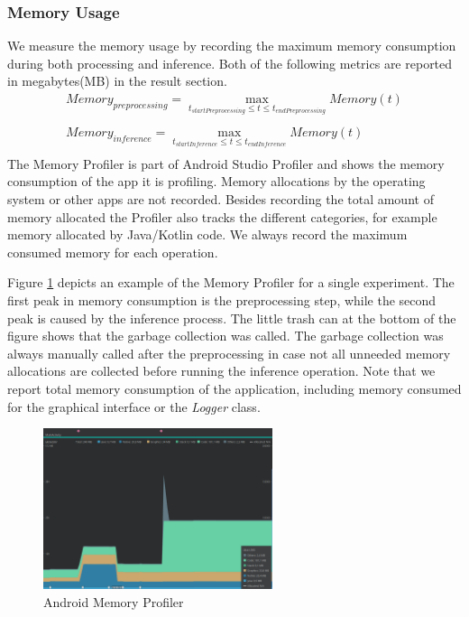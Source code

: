 \subsubsection{Memory Usage}
We measure the memory usage by recording the maximum memory consumption during both processing and inference. Both of the following metrics are reported in megabytes(MB) in the result section.
\begin{equation*}
\begin{gathered}
Memory_{preprocessing} = \max\limits_{t_{startPreprocessing} \leq t \leq t_{endPreprocessing}} Memory(t)\\\\
Memory_{inference} = \max\limits_{t_{startInference} \leq t \leq t_{endInference}} Memory(t)\\
\end{gathered}
\end{equation*}
The Memory Profiler is part of Android Studio Profiler and shows the memory consumption of the app it is profiling. Memory allocations by the operating system or other apps are not recorded. Besides recording the total amount of memory allocated the Profiler also tracks the different categories, for example memory allocated by Java/Kotlin code. We always record the maximum consumed memory for each operation.

Figure \ref{fig:prof_mem} depicts an example of the Memory Profiler for a single experiment. The first peak in memory consumption is the preprocessing step, while the second peak is caused by the inference process.
The little trash can at the bottom of the figure shows that the garbage collection was called. The garbage collection was always manually called after the preprocessing in case not all unneeded memory allocations are collected before running the inference operation. 
Note that we report total memory consumption of the application, including memory consumed for the graphical interface or the \emph{Logger} class.
\begin{figure}[H]
\centering
\includegraphics[width=0.6\textwidth]{./Bilder/profiler_MEM}
\caption{Android Memory Profiler}
\label{fig:prof_mem}
\end{figure}
